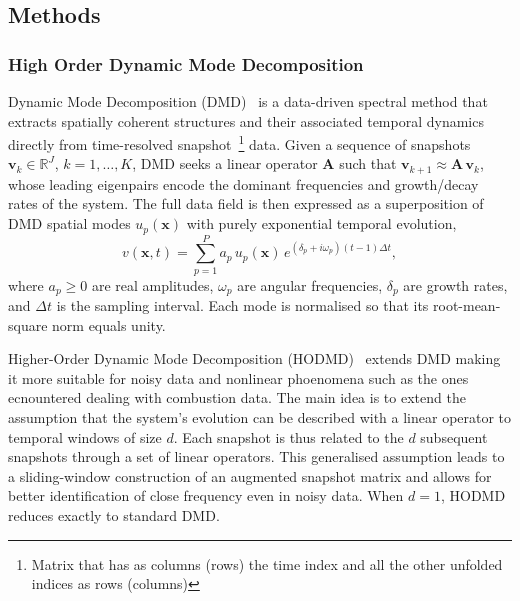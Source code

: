 \subsection{Methods}
\label{sec:methods_coria}

\subsubsection{High Order Dynamic Mode Decomposition}
\label{sec:dmd_hodmd}

Dynamic Mode Decomposition (DMD)~\cite{schmid2010}  is a data-driven spectral method that extracts spatially coherent structures and their associated temporal dynamics directly from time-resolved snapshot~\footnote{Matrix that has as columns (rows) the time index and all the other unfolded indices as rows (columns)} data.
Given a sequence of snapshots $\mathbf{v}_k \in \mathbb{R}^{J}$, $k = 1,\dots,K$, DMD seeks a linear operator $\mathbf{A}$ such that $\mathbf{v}_{k+1} \approx \mathbf{A}\,\mathbf{v}_k$, whose leading eigenpairs encode the dominant frequencies and growth/decay rates of the system.
The full data field is then expressed as a superposition of DMD spatial modes $u_p(\mathbf{x})$ with purely exponential temporal evolution,
\begin{equation}
    v(\mathbf{x},t) = \sum_{p=1}^{P} a_p\, u_p(\mathbf{x})\, e^{(\delta_p + i\omega_p)(t-1)\Delta t},
    \label{eq:dmd_expansion}
\end{equation}
where $a_p \geq 0$ are real amplitudes, $\omega_p$ are angular frequencies, $\delta_p$ are growth rates, and $\Delta t$ is the sampling interval.
Each mode is normalised so that its root-mean-square norm equals unity.

Higher-Order Dynamic Mode Decomposition (HODMD)~\cite{leclainche2017} extends DMD making it more suitable for noisy data and nonlinear phoenomena such as the ones ecnountered dealing with combustion data. The main idea is to extend the assumption that the system's evolution can be described with a linear operator to temporal windows of size $d$. Each snapshot is thus related to the $d$ subsequent snapshots through a set of linear operators.
This generalised assumption leads to a sliding-window construction of an augmented snapshot matrix and allows for better identification of close frequency even in noisy data. When $d = 1$, HODMD reduces exactly to standard DMD.

